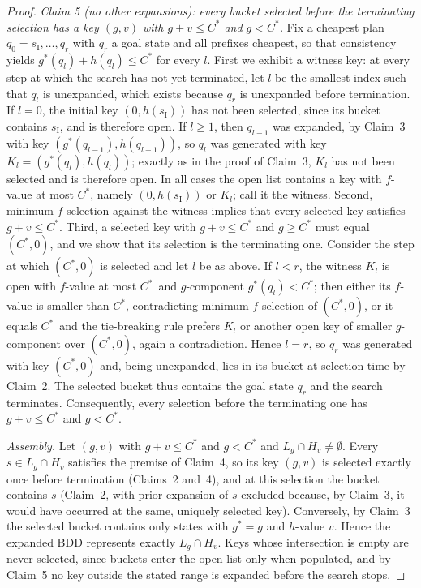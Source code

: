 \documentclass[letterpaper]{article}
\newcommand{\sinit}{\ensuremath{s_{\mathrm{I}}}}
\newcommand{\gstar}{\ensuremath{g^{*}}}
\newcommand{\copt}{\ensuremath{C^{*}}}
\newcommand{\level}[2]{\ensuremath{H_{#2}}}
\theoremstyle{plain}
\theoremstyle{definition}
\theoremstyle{remark}
\begin{document}
\begin{proof}
\emph{Claim 5 (no other expansions): every bucket selected before the
terminating selection has a key $(g,v)$ with $g + v \leq \copt$ and
$g < \copt$.}
Fix a cheapest plan $q_0 = \sinit, \dots, q_r$ with $q_r$ a goal state
and all prefixes cheapest, so that consistency yields
$\gstar(q_l) + h(q_l) \leq \copt$ for every $l$. First we exhibit a
witness key: at every step at which the search has not yet terminated,
let $l$ be the smallest index such that $q_l$ is unexpanded, which
exists because $q_r$ is unexpanded before termination. If $l = 0$, the
initial key $(0, h(\sinit))$ has not been selected, since its bucket
contains $\sinit$, and is therefore open. If $l \geq 1$, then $q_{l-1}$
was expanded, by Claim~3 with key $(\gstar(q_{l-1}), h(q_{l-1}))$, so
$q_l$ was generated with key $K_l = (\gstar(q_l), h(q_l))$; exactly as
in the proof of Claim~3, $K_l$ has not been selected and is therefore
open. In all cases the open list contains a key with $f$-value at most
\copt, namely $(0, h(\sinit))$ or $K_l$; call it the witness. Second,
minimum-$f$ selection against the witness implies that every selected
key satisfies $g + v \leq \copt$. Third, a selected key with
$g + v \leq \copt$ and $g \geq \copt$ must equal $(\copt, 0)$, and we
show that its selection is the terminating one. Consider the step at
which $(\copt, 0)$ is selected and let $l$ be as above. If $l < r$,
the witness $K_l$ is open with $f$-value at most \copt\ and
$g$-component $\gstar(q_l) < \copt$; then either its $f$-value is
smaller than \copt, contradicting minimum-$f$ selection of
$(\copt, 0)$, or it equals \copt\ and the tie-breaking rule prefers
$K_l$ or another open key of smaller $g$-component over $(\copt, 0)$,
again a contradiction. Hence $l = r$, so $q_r$ was generated with key
$(\copt, 0)$ and, being unexpanded, lies in its bucket at selection
time by Claim~2. The selected bucket thus contains the goal state
$q_r$ and the search terminates. Consequently, every selection before
the terminating one has $g + v \leq \copt$ and $g < \copt$.

\emph{Assembly.} Let $(g,v)$ with $g + v \leq \copt$ and $g < \copt$
and $L_g \cap \level{h}{v} \neq \emptyset$. Every
$s \in L_g \cap \level{h}{v}$ satisfies the premise of Claim~4, so its
key $(g,v)$ is selected exactly once before termination (Claims~2
and~4), and at this selection the bucket contains $s$ (Claim~2, with
prior expansion of $s$ excluded because, by Claim~3, it would have
occurred at the same, uniquely selected key). Conversely, by Claim~3
the selected bucket contains only states with $\gstar = g$ and
$h$-value $v$. Hence the expanded BDD represents exactly
$L_g \cap \level{h}{v}$. Keys whose intersection is empty are never
selected, since buckets enter the open list only when populated, and by
Claim~5 no key outside the stated range is expanded before the search
stops.
\end{proof}
\end{document}
